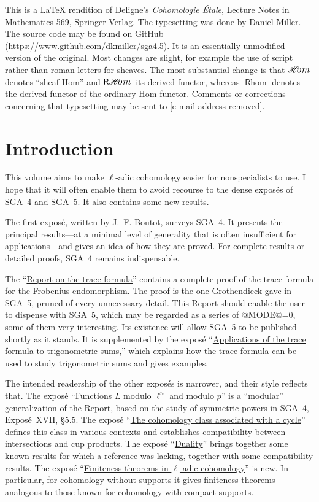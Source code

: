 \documentclass[oneside]{book}
\makeatletter
\providecommand\calligra{\itshape}}
\DeclareMathOperator{\Hom}{\mathscr{H}\text{\kern -3pt {\calligra\large om}}\,} %
\DeclareMathOperator{\rHom}{\mathsf{R}\vspace{-1pt}\mathscr{H}\text{\kern -3pt {\calligra\large om}}\,}
\DeclareMathOperator{\rhom}{\mathsf{R}\hom}
\theoremstyle{sga-source}
\theoremstyle{sga-source-dash}
\theoremstyle{sga-source-dotdash}
\theoremstyle{sga-source-number-note-dash}
\theoremstyle{sga-source-note-number-dotdash}
\theoremstyle{sga-source-example-dotdash}
\theoremstyle{sga-source-inline-number}
\theoremstyle{sga-source-bare-number}
\theoremstyle{sga-source}
\providecommand\EditionMode{@MODE@}
\providecommand\EditionLanguage{en}
\DeclareRobustCommand{\EditionVariantMark}[2]{%
  \ifx\relax#1\relax\else
    \ifmmode
      \hbox{\raisebox{0.7ex}{\normalfont\scriptsize\color{EditionAppColor}%
        \hyperlink{apparatus:#1}{\EditionShortOccurrence{#1}}}}%
    \else
      \textsuperscript{\normalfont\scriptsize\color{EditionAppColor}%
        \hyperlink{apparatus:#1}{\EditionShortOccurrence{#1}}}%
    \fi
  \fi}
\def\EditionShortOccurrence#1{\expandafter\EditionShortOccurrenceAux#1\@nil}
\def\EditionShortOccurrenceAux#1-#2\@nil{\number#2\relax}
\DeclareRobustCommand{\var}[4][]{%
  \ifnum\EditionMode=0\relax
    \expandafter\@firstoftwo
  \else
    \expandafter\@secondoftwo
  \fi
  {#2}{\ifnum\EditionMode=1\relax\EditionVariantMark{#1}{#4}\fi#3}}
\providecommand\CurrentPrintPage{}
\DeclareRobustCommand{\PrintPage}[1]{%
  \gdef\CurrentPrintPage{#1}%
  \hypertarget{printpage:\EditionLanguage:#1}{}%
  \marginnote{\normalfont\sffamily\scriptsize\color{black!65}%
    \ifnum\EditionMode=2\relax#1\else[p.~#1]\fi}}
\DeclareRobustCommand{\MathPage}[1]{\PrintPage{#1}}
\def\EditionPDFVar[#1]#2#3#4{\ifnum\EditionMode=0\relax\expandafter\@firstoftwo\else\expandafter\@secondoftwo\fi{#2}{#3}}
\let\var\EditionPDFVar
\def\PrintPage#1{}\def\MathPage#1{}%
\def\EditionVariantMark#1#2{}}
\makeatother
\begin{document}
This is a \LaTeX{} rendition of Deligne's \emph{Cohomologie \'Etale},
Lecture Notes in Mathematics 569, Springer-Verlag. The typesetting was done by
Daniel Miller. The source code may be found on GitHub
(\url{https://www.github.com/dkmiller/sga4.5}). It is an essentially
unmodified version of the original. Most changes are slight, for example the
use of script rather than roman letters for sheaves. The most substantial
change is that $\Hom$ denotes ``sheaf Hom'' and $\rHom$ its derived functor,
whereas $\rhom$ denotes the derived functor of the ordinary Hom functor.
Comments or corrections concerning that typesetting may be sent to
[e-mail address removed].


\clearpage\fi
\clearpage{}\hypersetup{pageanchor=true}


\chapter*{Introduction}\PrintPage{III}

This volume aims to make $\ell$-adic cohomology easier for nonspecialists to
use. I hope that it will often enable them to avoid recourse to the dense
expos\'es of SGA~4 and SGA~5. It also contains some new results.

The first expos\'e, written by J.~F. Boutot, surveys SGA~4. It presents the
principal results---at a minimal level of generality that is often
insufficient for applications---and gives an idea of how they are proved. For
complete results or detailed proofs, SGA~4 remains indispensable.

The ``\hyperref[II]{Report on the trace formula}'' contains a complete proof of the trace formula for the
Frobenius endomorphism. The proof is the one Grothendieck gave in SGA~5,
pruned of every unnecessary detail. This Report should enable the user to
dispense with SGA~5, which may be regarded as a series of \var[EN-0001]{digression}{digressions}{SGA45-CORR-0001}, some of
them very interesting. Its existence will allow SGA~5 to be published shortly
as it stands. It is supplemented by the expos\'e ``\hyperref[VI]{Applications of the trace formula to trigonometric sums},'' which
explains how the trace formula can be used to study trigonometric sums and
gives examples.

The intended readership of the other expos\'es is narrower, and their style
reflects that. The expos\'e ``\hyperref[III]{Functions $L$ modulo $\ell^n$ and modulo $p$}'' is a ``modular'' generalization
of the Report, based on the study of symmetric powers in SGA~4, Expos\'e~XVII,
\S5.5. The expos\'e ``\hyperref[IV]{The cohomology class associated with a cycle}'' defines this class in various contexts
and establishes compatibility between intersections and cup products. The
expos\'e ``\hyperref[V]{Duality}'' brings together some known results for which a
reference was lacking, together with some compatibility results. The expos\'e
``\hyperref[VII]{Finiteness theorems in $\ell$-adic cohomology}'' is new. In particular, for cohomology without supports it
gives finiteness theorems analogous to those known for cohomology with compact
supports.
\end{document}
